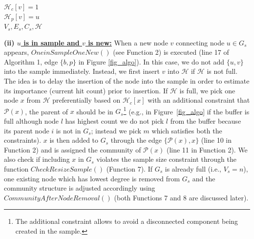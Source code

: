 \begin{function2}[!t]
\caption{\small$OneinSampleOneNew(u,v,e_t,V_s,E_s,\mathcal{H},C_s)$}

$\mathcal{H}_c[v]=1$\\ 
$\mathcal{H}_p[v]=u$\\ 
\Return $V_s,E_s,C_s,\mathcal{H}$   
\end{function2}


\noindent\textbf{(ii) \underline{$u$ is in sample and $v$ is new:}} When a new node $v$  connecting node $u\in G_s$ appears, $OneinSampleOneNew()$ (see Function 2) is executed (line 17 of Algorithm 1, edge $\{b,p\}$ in Figure \ref{fig_algo}). In this case, we do not add $\{u,v\}$ into the sample immediately. Instead, we first insert $v$ into $\mathcal{H}$ if $\mathcal{H}$ is not full. 
The idea is to delay the insertion of the node into the sample in order to estimate its importance (current hit count) prior to insertion.
If $\mathcal{H}$ is full, we pick one node $x$ from $\mathcal{H}$ preferentially based on $\mathcal{H}_c[x]$ with an additional constraint that $\mathcal{P}(x)$, the parent of $x$  should be in $G_s$\footnote{The additional constraint allows to avoid a disconnected component being created in the sample.} (e.g., in Figure~\ref{fig_algo} if the buffer is full although node $l$ has highest count we do not pick $l$ from the buffer  because its parent node $i$ is not in $G_s$; instead we pick $m$ which satisfies both the constraints).  $x$ is then added to $G_s$ through the edge $\{\mathcal{P}(x),x\}$ (line 10 in Function 2) and is assigned the community of $\mathcal{P}(x)$ (line 11 in Function 2). We also check if including $x$ in $G_s$ violates the sample size constraint through the function 
$CheckResizeSample()$ (Function 7). If $G_s$ is already full (i.e., $V_s=n$), one existing node which has lowest degree is removed from $G_s$ and the community structure is adjusted accordingly using $CommunityAfterNodeRemoval()$ (both Functions 7 and 8 are discussed later).


